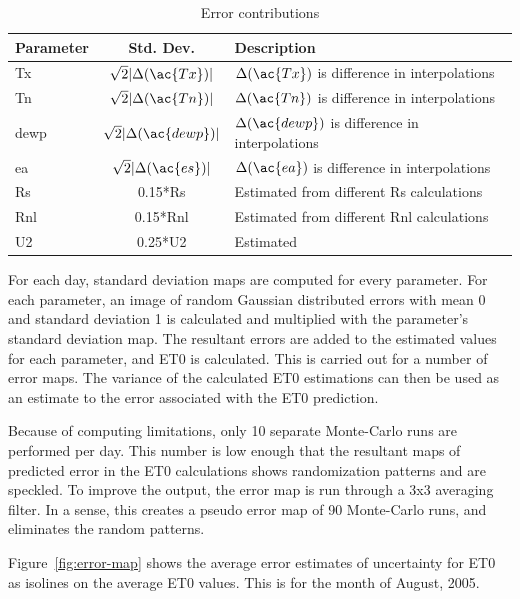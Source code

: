 \documentclass[reviewcopy]{elsart}
\begin{document}
\begin{table}
  \centering
  \caption{Error contributions}
  \begin{tabular}{l|c|l}
    Parameter & Std. Dev. & Description \\
    \hline \hline
    \ac{Tx} & $\sqrt{2}|\Delta(\ac{Tx})|$ & $\Delta(\ac{Tx})$ is difference in interpolations \\
    \ac{Tn} & $\sqrt{2}|\Delta(\ac{Tn})|$ & $\Delta(\ac{Tn})$ is difference in interpolations \\
    \ac{dewp} & $\sqrt{2}|\Delta(\ac{dewp})|$ & $\Delta(\ac{dewp})$ is difference in interpolations \\
    \ac{ea} & $\sqrt{2}|\Delta(\ac{es})|$ & $\Delta(\ac{ea})$ is difference in interpolations \\
    \ac{Rs} & 0.15*\ac{Rs} & Estimated from different \ac{Rs} calculations \\
    \ac{Rnl} & 0.15*\ac{Rnl} & Estimated from different \ac{Rnl} calculations \\
    \ac{U2} & 0.25*\ac{U2} & Estimated \\
  \end{tabular}
  \label{tab:errors}
\end{table}

For each day, standard deviation maps are computed for every
parameter.  For each parameter, an image of random Gaussian
distributed errors with mean 0 and standard deviation 1 is calculated
and multiplied with the parameter's standard deviation map.  The
resultant errors are added to the estimated values for each parameter,
and \ac{ET0} is calculated.  This is carried out for a number of error
maps.  The variance of the calculated \ac{ET0} estimations can then be
used as an estimate to the error associated with the \ac{ET0}
prediction.

Because of computing limitations, only 10 separate Monte-Carlo runs
are performed per day.  This number is low enough that the resultant
maps of predicted error in the \ac{ET0} calculations shows
randomization patterns and are speckled.  To improve the output, the
error map is run through a 3x3 averaging filter.  In a sense, this
creates a pseudo error map of 90 Monte-Carlo runs, and eliminates the
random patterns.

Figure~\ref{fig:error-map} shows the average error estimates of
uncertainty for \ac{ET0} as isolines on the average \ac{ET0} values.
This is for the month of August, 2005.
\end{document}
